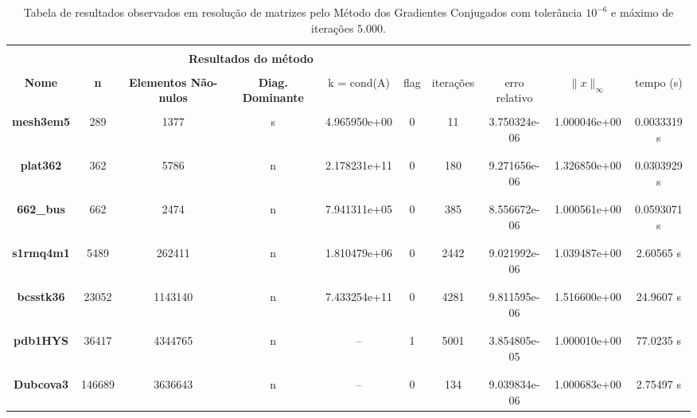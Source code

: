 
\begin{table}[ht]
    \centering
    \begin{tabular}{|c|c|c|c|c|c|c|c|c|c|}
        \hline \rowcolor{Gray}
        \multicolumn{10}{|c|}{\bfseries Tabela do Método dos Gradientes Conjugados com tolerância $10^{-6}$ e máximo de iterações $5.000$ }\\
        \hline \rowcolor{Gray}  \multicolumn{5}{|c|}{} & \multicolumn{5}{|c|}{} \\
         [-1em]  \rowcolor{Gray}
         \multicolumn{5}{|c|}{\bfseries Informações da matriz } & \multicolumn{5}{|c|}{\bfseries Resultados do método }\\
         \hline \rowcolor{Gray} & & & & & & & & & \\
         [-1em]
         \rowcolor{Gray}
         \bfseries Nome & \bfseries n & \bfseries Elementos Não-nulos & \bfseries Diag. Dominante &
         k = cond(A) & flag & iterações &
         erro relativo &
         $\|x\|_\infty$  & tempo (s) \\
         \hline & & & & & & & & & \\
         [-1em] \bfseries mesh3em5 & 289 & 1377 & s & 4.965950e+00 & 0 & 11 & 3.750324e-06 & 1.000046e+00  & 0.0033319 s \\ & & & & & & & & & \\ [-1em] \hline \\
         [-1em] \bfseries plat362 & 362 & 5786 & n & 2.178231e+11 & 0 & 180 & 9.271656e-06 & 1.326850e+00  & 0.0303929 s \\ & & & & & & & & & \\ [-1em] \hline \\
         [-1em] \bfseries 662\_bus & 662 & 2474 & n & 7.941311e+05 & 0 & 385 & 8.556672e-06 & 1.000561e+00  & 0.0593071 s \\ & & & & & & & & & \\ [-1em] \hline \\
         [-1em] \bfseries s1rmq4m1 & 5489 & 262411 & n & 1.810479e+06 & 0 & 2442 & 9.021992e-06 & 1.039487e+00 & 2.60565 s \\ & & & & & & & & & \\ [-1em] \hline \\
         [-1em] \bfseries bcsstk36 & 23052 & 1143140 & n  & 7.433254e+11 & 0 & 4281 & 9.811595e-06 & 1.516600e+00 & 24.9607 s \\ & & & & & & & & & \\ [-1em] \hline \\
         [-1em] \bfseries pdb1HYS & 36417 & 4344765 & n & -- & 1 & 5001 & 3.854805e-05 & 1.000010e+00 & 77.0235 s \\ & & & & & & & & & \\ [-1em] \hline \\
         [-1em] \bfseries Dubcova3 & 146689 & 3636643 & n & -- & 0 & 134 & 9.039834e-06 & 1.000683e+00  & 2.75497 s \\ \hline
    \end{tabular}
    \caption{Tabela de resultados observados em resolução de matrizes pelo Método dos Gradientes Conjugados com tolerância $10^{-6}$ e máximo de iterações $5.000$.}
    \label{tab:resultados-5k-6}
\end{table}